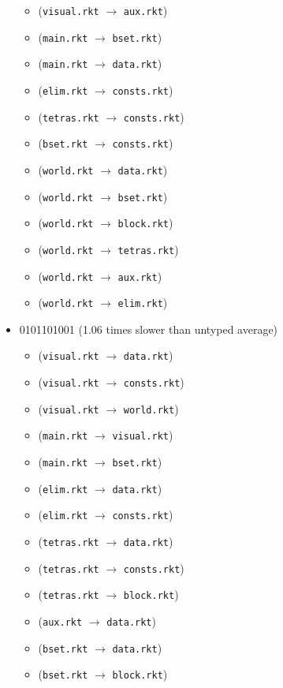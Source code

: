 \documentclass{article}
\newcommand{\mono}[1]{\texttt{#1}}
\begin{document}
\begin{itemize}
\begin{itemize}
  \item (\mono{visual.rkt} $\rightarrow$ \mono{aux.rkt})
  \item (\mono{main.rkt} $\rightarrow$ \mono{bset.rkt})
  \item (\mono{main.rkt} $\rightarrow$ \mono{data.rkt})
  \item (\mono{elim.rkt} $\rightarrow$ \mono{consts.rkt})
  \item (\mono{tetras.rkt} $\rightarrow$ \mono{consts.rkt})
  \item (\mono{bset.rkt} $\rightarrow$ \mono{consts.rkt})
  \item (\mono{world.rkt} $\rightarrow$ \mono{data.rkt})
  \item (\mono{world.rkt} $\rightarrow$ \mono{bset.rkt})
  \item (\mono{world.rkt} $\rightarrow$ \mono{block.rkt})
  \item (\mono{world.rkt} $\rightarrow$ \mono{tetras.rkt})
  \item (\mono{world.rkt} $\rightarrow$ \mono{aux.rkt})
  \item (\mono{world.rkt} $\rightarrow$ \mono{elim.rkt})
  \end{itemize}
\item 0101101001 (1.06 times slower than untyped average)
  \begin{itemize}
  \item (\mono{visual.rkt} $\rightarrow$ \mono{data.rkt})
  \item (\mono{visual.rkt} $\rightarrow$ \mono{consts.rkt})
  \item (\mono{visual.rkt} $\rightarrow$ \mono{world.rkt})
  \item (\mono{main.rkt} $\rightarrow$ \mono{visual.rkt})
  \item (\mono{main.rkt} $\rightarrow$ \mono{bset.rkt})
  \item (\mono{elim.rkt} $\rightarrow$ \mono{data.rkt})
  \item (\mono{elim.rkt} $\rightarrow$ \mono{consts.rkt})
  \item (\mono{tetras.rkt} $\rightarrow$ \mono{data.rkt})
  \item (\mono{tetras.rkt} $\rightarrow$ \mono{consts.rkt})
  \item (\mono{tetras.rkt} $\rightarrow$ \mono{block.rkt})
  \item (\mono{aux.rkt} $\rightarrow$ \mono{data.rkt})
  \item (\mono{bset.rkt} $\rightarrow$ \mono{data.rkt})
  \item (\mono{bset.rkt} $\rightarrow$ \mono{block.rkt})

\end{itemize}
\end{itemize}
\end{document}
